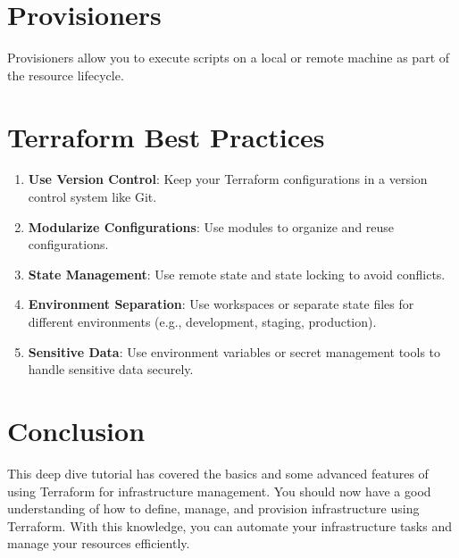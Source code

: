 \documentclass[
  letterpaper,
  DIV=11,
  numbers=noendperiod]{scrreprt}
\newenvironment{Shaded}{\begin{snugshade}}{\end{snugshade}}
\newcommand{\NormalTok}[1]{\textcolor[rgb]{0.00,0.23,0.31}{#1}}
\providecommand{\tightlist}{%
  \setlength{\itemsep}{0pt}\setlength{\parskip}{0pt}}\usepackage{longtable,booktabs,array}
\begin{document}
\section{Provisioners}\label{provisioners}

Provisioners allow you to execute scripts on a local or remote machine
as part of the resource lifecycle.

\begin{Shaded}
\end{Shaded}

\section{Terraform Best Practices}\label{terraform-best-practices}

\begin{enumerate}
\def\labelenumi{\arabic{enumi}.}
\tightlist
\item
  \textbf{Use Version Control}: Keep your Terraform configurations in a
  version control system like Git.
\item
  \textbf{Modularize Configurations}: Use modules to organize and reuse
  configurations.
\item
  \textbf{State Management}: Use remote state and state locking to avoid
  conflicts.
\item
  \textbf{Environment Separation}: Use workspaces or separate state
  files for different environments (e.g., development, staging,
  production).
\item
  \textbf{Sensitive Data}: Use environment variables or secret
  management tools to handle sensitive data securely.
\end{enumerate}

\section{Conclusion}\label{conclusion-52}

This deep dive tutorial has covered the basics and some advanced
features of using Terraform for infrastructure management. You should
now have a good understanding of how to define, manage, and provision
infrastructure using Terraform. With this knowledge, you can automate
your infrastructure tasks and manage your resources efficiently.
\end{document}
